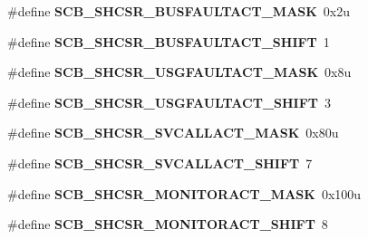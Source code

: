 \begin{DoxyCompactItemize}
\item 
\hypertarget{group___s_c_b___register___masks_gac9b941a1848ab5648220ac724811626d}{}\#define {\bfseries S\+C\+B\+\_\+\+S\+H\+C\+S\+R\+\_\+\+B\+U\+S\+F\+A\+U\+L\+T\+A\+C\+T\+\_\+\+M\+A\+S\+K}~0x2u\label{group___s_c_b___register___masks_gac9b941a1848ab5648220ac724811626d}

\item 
\hypertarget{group___s_c_b___register___masks_ga32a717e07bf15df325707ed464931ebd}{}\#define {\bfseries S\+C\+B\+\_\+\+S\+H\+C\+S\+R\+\_\+\+B\+U\+S\+F\+A\+U\+L\+T\+A\+C\+T\+\_\+\+S\+H\+I\+F\+T}~1\label{group___s_c_b___register___masks_ga32a717e07bf15df325707ed464931ebd}

\item 
\hypertarget{group___s_c_b___register___masks_gafd80e2063c3bdb176ccace11cedc30fb}{}\#define {\bfseries S\+C\+B\+\_\+\+S\+H\+C\+S\+R\+\_\+\+U\+S\+G\+F\+A\+U\+L\+T\+A\+C\+T\+\_\+\+M\+A\+S\+K}~0x8u\label{group___s_c_b___register___masks_gafd80e2063c3bdb176ccace11cedc30fb}

\item 
\hypertarget{group___s_c_b___register___masks_ga0b4de7cda03d088ce7d65ac0dc9de6f0}{}\#define {\bfseries S\+C\+B\+\_\+\+S\+H\+C\+S\+R\+\_\+\+U\+S\+G\+F\+A\+U\+L\+T\+A\+C\+T\+\_\+\+S\+H\+I\+F\+T}~3\label{group___s_c_b___register___masks_ga0b4de7cda03d088ce7d65ac0dc9de6f0}

\item 
\hypertarget{group___s_c_b___register___masks_ga4bb1b1dfbed424de0294b52b181bb962}{}\#define {\bfseries S\+C\+B\+\_\+\+S\+H\+C\+S\+R\+\_\+\+S\+V\+C\+A\+L\+L\+A\+C\+T\+\_\+\+M\+A\+S\+K}~0x80u\label{group___s_c_b___register___masks_ga4bb1b1dfbed424de0294b52b181bb962}

\item 
\hypertarget{group___s_c_b___register___masks_gaba820858a54c18f1280a32238d14e5e0}{}\#define {\bfseries S\+C\+B\+\_\+\+S\+H\+C\+S\+R\+\_\+\+S\+V\+C\+A\+L\+L\+A\+C\+T\+\_\+\+S\+H\+I\+F\+T}~7\label{group___s_c_b___register___masks_gaba820858a54c18f1280a32238d14e5e0}

\item 
\hypertarget{group___s_c_b___register___masks_ga4b63e9fdfdae08017acf41205124bd5e}{}\#define {\bfseries S\+C\+B\+\_\+\+S\+H\+C\+S\+R\+\_\+\+M\+O\+N\+I\+T\+O\+R\+A\+C\+T\+\_\+\+M\+A\+S\+K}~0x100u\label{group___s_c_b___register___masks_ga4b63e9fdfdae08017acf41205124bd5e}

\item 
\hypertarget{group___s_c_b___register___masks_gaa3cff0faf4b66fef5a2fba34c5f21fc4}{}\#define {\bfseries S\+C\+B\+\_\+\+S\+H\+C\+S\+R\+\_\+\+M\+O\+N\+I\+T\+O\+R\+A\+C\+T\+\_\+\+S\+H\+I\+F\+T}~8\label{group___s_c_b___register___masks_gaa3cff0faf4b66fef5a2fba34c5f21fc4}


\end{DoxyCompactItemize}
